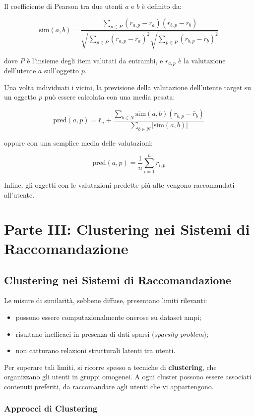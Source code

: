 Il coefficiente di Pearson tra due utenti $a$ e $b$ è definito da:

\[
\text{sim}(a,b) = \frac{\sum_{p \in P}(r_{a,p} - \bar{r}_a)(r_{b,p} - \bar{r}_b)}{\sqrt{\sum_{p \in P}(r_{a,p} - \bar{r}_a)^2} \sqrt{\sum_{p \in P}(r_{b,p} - \bar{r}_b)^2}}
\]

dove $P$ è l’insieme degli item valutati da entrambi, e $r_{a,p}$ è la valutazione dell’utente $a$ sull’oggetto $p$.

Una volta individuati i vicini, la previsione della valutazione dell’utente target su un oggetto $p$ può essere calcolata con una media pesata:

\[
\text{pred}(a,p) = \bar{r}_a + \frac{\sum_{b \in N} \text{sim}(a,b) (r_{b,p} - \bar{r}_b)}{\sum_{b \in N} |\text{sim}(a,b)|}
\]

oppure con una semplice media delle valutazioni:

\[
\text{pred}(a,p) = \frac{1}{n} \sum_{i=1}^n r_{i,p}
\]

Infine, gli oggetti con le valutazioni predette più alte vengono raccomandati all’utente.

\section{Parte III: Clustering nei Sistemi di Raccomandazione}

\subsection{Clustering nei Sistemi di Raccomandazione}

Le misure di similarità, sebbene diffuse, presentano limiti rilevanti:
\begin{itemize}
    \item possono essere computazionalmente onerose su dataset ampi;
    \item risultano inefficaci in presenza di dati sparsi (\emph{sparsity problem});
    \item non catturano relazioni strutturali latenti tra utenti.
\end{itemize}

Per superare tali limiti, si ricorre spesso a tecniche di \textbf{clustering}, che organizzano gli utenti in gruppi omogenei. A ogni cluster possono essere associati contenuti preferiti, da raccomandare agli utenti che vi appartengono.

\subsubsection{Approcci di Clustering}

